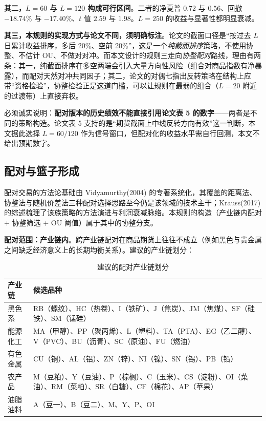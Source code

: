 \textbf{其二，$L=60$ 与 $L=120$ 构成可行区间}。二者的净夏普 $0.72$ 与 $0.56$、回撤 $-18.74\%$ 与 $-17.40\%$、$t$ 值 $2.59$ 与 $1.98$。$L=250$ 的收益与显著性都明显衰减。

\textbf{其三，本规则的实现方式与论文不同，须明确标注}。论文的截面口径是“按过去 $L$ 日累计收益排序，多后 20\%、空前 20\%”，这是一个\emph{纯截面排序}策略，不使用协整、不估计 OU、不做对对冲。而本文设计的规则三走向\emph{协整配对}路线，理由有两条：其一，纯截面排序在多空两端会引入大量方向性风险（组合对商品指数有净暴露），而配对天然对冲共同因子；其二，论文的对偶七指出反转策略在结构上应带“资格检验”，协整检验正是这道门槛，可以让规则在最弱的组合（$L=20$ 附近的过渡带）上直接弃权。

必须诚实说明：\textbf{配对版本的历史绩效不能直接引用论文表 5 的数字}——两者是不同的策略构造。论文表 5 支持的是“期货截面上中线反转方向有效”这一判断，本文据此选择 $L=60/120$ 作为信号窗口，但配对化的收益水平需自行回测，本文不给出预期数字。

\subsection{配对与篮子形成}

配对交易的方法论基础由 Vidyamurthy(2004) 的专著系统化，其覆盖的距离法、协整法与随机价差法三种配对选择思路至今仍是该领域的技术主干\cite{vidyamurthy2004}；Krauss(2017) 的综述梳理了该族策略的方法演进与利润衰减脉络\cite{krauss2017}。本规则的构造（产业链内配对 + 协整筛选 + OU 阈值）属于其中的协整分支。

\textbf{配对范围：产业链内}。跨产业链配对在商品期货上往往不成立（例如黑色与贵金属之间缺乏经济意义上的长期均衡关系）。建议的产业链划分：

\begin{table}[htbp]
\centering\footnotesize
\caption{建议的配对产业链划分}\label{tab:chains}
\begin{tabular}{@{}>{\raggedright\arraybackslash}p{3.2cm}>{\raggedright\arraybackslash}p{10.8cm}@{}}
\toprule
\textbf{产业链} & \textbf{候选品种} \\
\midrule
黑色系 & RB（螺纹）、HC（热卷）、I（铁矿）、J（焦炭）、JM（焦煤）、SF（硅铁）、SM（锰硅） \\
能源化工 & MA（甲醇）、PP（聚丙烯）、L（塑料）、TA（PTA）、EG（乙二醇）、V（PVC）、BU（沥青）、SC（原油）、FU（燃油） \\
有色金属 & CU（铜）、AL（铝）、ZN（锌）、NI（镍）、SN（锡）、PB（铅） \\
农产品 & M（豆粕）、Y（豆油）、P（棕榈）、C（玉米）、CS（淀粉）、OI（菜油）、RM（菜粕）、SR（白糖）、CF（棉花）、AP（苹果） \\
油脂油料 & A（豆一）、B（豆二）、M、Y、P、OI \\
\bottomrule
\end{tabular}
\end{table}

